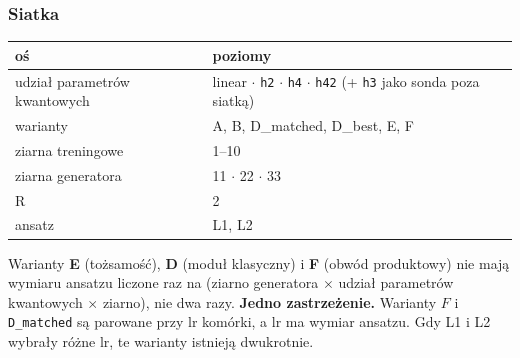\documentclass[11pt, a4paper]{article}
\begin{document}
\subsubsection{Siatka}\label{sec:siatka}

\begin{table}[H]
\centering
\renewcommand{\arraystretch}{1.3}
\begin{tabularx}{\textwidth}{lX}
\toprule
\textbf{oś} & \textbf{poziomy} \\
\midrule
udział parametrów kwantowych & linear $\cdot$ \texttt{h2} $\cdot$ \texttt{h4} $\cdot$ \texttt{h42} (+ \texttt{h3} jako sonda poza siatką) \\
warianty & A, B, D\_matched, D\_best, E, F \\
ziarna treningowe & 1--10 \\
ziarna generatora & 11 $\cdot$ 22 $\cdot$ 33  \\
R & 2 \\
ansatz & L1, L2 \\
\bottomrule
\end{tabularx}
\end{table}

Warianty \textbf{E} (tożsamość), \textbf{D} (moduł klasyczny) i \textbf{F} (obwód produktowy) nie mają wymiaru ansatzu liczone raz na (ziarno generatora $\times$ udział parametrów kwantowych $\times$ ziarno), nie dwa razy. \textbf{Jedno zastrzeżenie.} Warianty $F$ i \texttt{D\_matched} są parowane przy lr komórki, a lr ma wymiar ansatzu. Gdy L1 i L2 wybrały różne lr, te warianty istnieją dwukrotnie.
\end{document}
